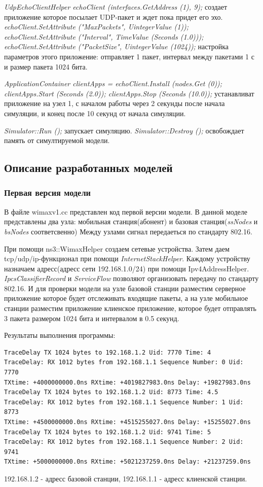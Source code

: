 \documentclass[14pt,a4paper]{article}
\begin{document}
\textit{UdpEchoClientHelper echoClient (interfaces.GetAddress (1), 9);} создает
приложение которое посылает UDP-пакет и ждет пока придет его эхо.
\textit{echoClient.SetAttribute ("MaxPackets", UintegerValue (1));
echoClient.SetAttribute ("Interval", TimeValue (Seconds (1.0)));
echoClient.SetAttribute ("PacketSize", UintegerValue (1024));} настройка
параметров этого приложение: отправляет 1 пакет, интервал между пакетами 1 с и
размер пакета 1024 бита.

\textit{ApplicationContainer clientApps = echoClient.Install (nodes.Get (0));
  clientApps.Start (Seconds (2.0));
  clientApps.Stop (Seconds (10.0));} устанавливат приложение на узел 1, с
  началом работы через 2 секунды после начала симуляции, и конец после 10 секунд
  от начала симуляции.
  
\textit{Simulator::Run ();} запускает симуляцию.
\textit{Simulator::Destroy ();} освобождает память от симултируемой модели.
  
  
\subsection{Описание разработанных моделей}
\subsubsection{Первая версия модели}
В файле wimaxv1.cc представлен код первой версии модели. В данной моделе
представлены два узла: мобильная станция(абонент) и базовая
станция(\textit{ssNodes} и \textit{bsNodes} соответсвенно) Между узлами сигнал
передаеться по стандарту 802.16. 

При помощи ns3::WimaxHelper создаем сетевые устройства. Затем даем
tcp/udp/ip-функционал при помощи \textit{InternetStackHelper}. Каждому
устройству назначаем адресс(адресс сети 192.168.1.0/24) при помощи
Ipv4AddressHelper. \textit{IpcsClassifierRecord} и \textit{ServiceFlow}
позволяют организовать передачу по стандарту 802.16. И для проверки модели на
узле базовой станции разместим серверное приложение которое будет отслеживать
входящие пакеты, а на узле мобильное станции разместим приложение клиенское
приложение, которое будет отправлять 3 пакета размером 1024 бита и интервалом в
0.5 секунд.

\vspace{1cm}
Результаты выполнения программы:
\begin{verbatim}
TraceDelay TX 1024 bytes to 192.168.1.2 Uid: 7770 Time: 4
TraceDelay: RX 1012 bytes from 192.168.1.1 Sequence Number: 0 Uid: 7770 
TXtime: +4000000000.0ns RXtime: +4019827983.0ns Delay: +19827983.0ns
TraceDelay TX 1024 bytes to 192.168.1.2 Uid: 8773 Time: 4.5
TraceDelay: RX 1012 bytes from 192.168.1.1 Sequence Number: 1 Uid: 8773 
TXtime: +4500000000.0ns RXtime: +4515255027.0ns Delay: +15255027.0ns
TraceDelay TX 1024 bytes to 192.168.1.2 Uid: 9741 Time: 5
TraceDelay: RX 1012 bytes from 192.168.1.1 Sequence Number: 2 Uid: 9741 
TXtime: +5000000000.0ns RXtime: +5021237259.0ns Delay: +21237259.0ns
\end{verbatim}
192.168.1.2 - адресс базовой станции, 192.168.1.1 - адресс клиенской станции.
\end{document}
